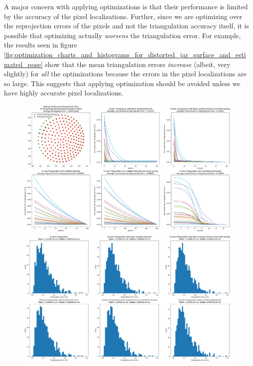 \documentclass[11pt, letterpaper]{extarticle} %
\begin{document}
A major concern with applying optimizations is that their performance is limited by the accuracy of the pixel localizations. Further, since we are optimizing over the reprojection errors of the pixels and not the triangulation accuracy itself, it is possible that optimizing actually \textit{worsens} the triangulation error. For example, the results seen in figure \ref{fig:optimization_charts_and_histograms_for_distorted_jar_surface_and_estimated_pose} show that the mean triangulation errors \textit{increase} (albeit, very slightly) for \textit{all} the optimizations because the errors in the pixel localizations are so large. This suggests that applying optimization should be avoided unless we have highly accurate pixel localizations. 

\begin{figure}[h]
    \centering
    \includegraphics[width=\textwidth]{optimization_charts_for_ideal_jar_surface_and_ground_truth_pose.png}
    \includegraphics[width=\textwidth]{ideal_jar_surface_ground_truth_pose_triangulation_error_histograms.png}

\end{figure}
\end{document}
